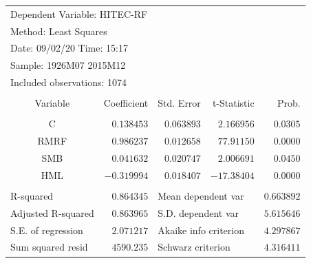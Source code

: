 \documentclass[12pt]{article}
\numberwithin{equation}{section} %
\begin{document}
\begin{table}[!h]
\centering
\begin{tabular}{lrrrr}
\multicolumn{3}{l}{Dependent Variable: HITEC-RF}&\multicolumn{1}{c}{}&\multicolumn{1}{c}{}\\
\multicolumn{2}{l}{Method: Least Squares}&\multicolumn{1}{c}{}&\multicolumn{1}{c}{}&\multicolumn{1}{c}{}\\
\multicolumn{2}{l}{Date: 09/02/20   Time: 15:17}&\multicolumn{1}{c}{}&\multicolumn{1}{c}{}&\multicolumn{1}{c}{}\\
\multicolumn{2}{l}{Sample: 1926M07 2015M12}&\multicolumn{1}{c}{}&\multicolumn{1}{c}{}&\multicolumn{1}{c}{}\\
\multicolumn{3}{l}{Included observations: 1074}&\multicolumn{1}{c}{}&\multicolumn{1}{c}{}\\
[4.5pt] \hline \\ [-4.5pt]
\multicolumn{1}{c}{Variable}&\multicolumn{1}{r}{Coefficient}&\multicolumn{1}{r}{Std. Error}&\multicolumn{1}{r}{t-Statistic}&\multicolumn{1}{r}{Prob.}\\
[4.5pt] \hline \\ [-4.5pt]
\multicolumn{1}{c}{C}&\multicolumn{1}{r}{$0.138453$}&\multicolumn{1}{r}{$0.063893$}&\multicolumn{1}{r}{$2.166956$}&\multicolumn{1}{r}{$0.0305$}\\
\multicolumn{1}{c}{RMRF}&\multicolumn{1}{r}{$0.986237$}&\multicolumn{1}{r}{$0.012658$}&\multicolumn{1}{r}{$77.91150$}&\multicolumn{1}{r}{$0.0000$}\\
\multicolumn{1}{c}{SMB}&\multicolumn{1}{r}{$0.041632$}&\multicolumn{1}{r}{$0.020747$}&\multicolumn{1}{r}{$2.006691$}&\multicolumn{1}{r}{$0.0450$}\\
\multicolumn{1}{c}{HML}&\multicolumn{1}{r}{$-0.319994$}&\multicolumn{1}{r}{$0.018407$}&\multicolumn{1}{r}{$-17.38404$}&\multicolumn{1}{r}{$0.0000$}\\
[4.5pt] \hline \\ [-4.5pt]
\multicolumn{1}{l}{R-squared}&\multicolumn{1}{r}{$0.864345$}&\multicolumn{2}{l}{Mean dependent var}&\multicolumn{1}{r}{$0.663892$}\\
\multicolumn{1}{l}{Adjusted R-squared}&\multicolumn{1}{r}{$0.863965$}&\multicolumn{2}{l}{S.D. dependent var}&\multicolumn{1}{r}{$5.615646$}\\
\multicolumn{1}{l}{S.E. of regression}&\multicolumn{1}{r}{$2.071217$}&\multicolumn{2}{l}{Akaike info criterion}&\multicolumn{1}{r}{$4.297867$}\\
\multicolumn{1}{l}{Sum squared resid}&\multicolumn{1}{r}{$4590.235$}&\multicolumn{2}{l}{Schwarz criterion}&\multicolumn{1}{r}{$4.316411$}\\

\end{tabular}
\end{table}
\end{document}
